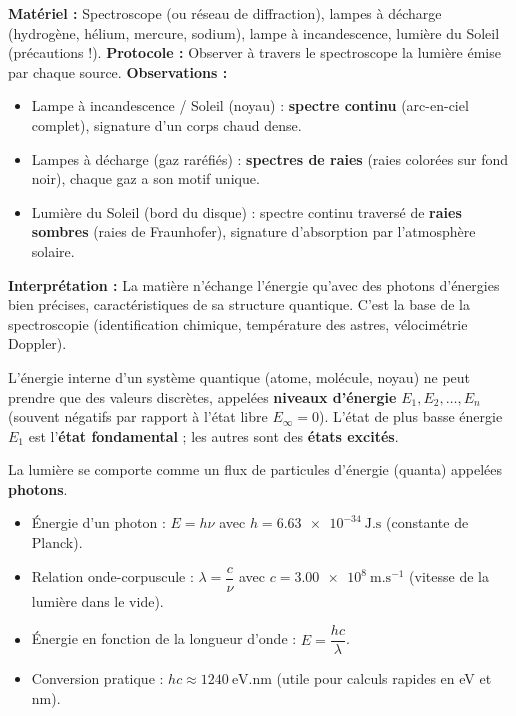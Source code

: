 \documentclass[11pt]{article}
\begin{document}
\begin{experience}
\textbf{Matériel :} Spectroscope (ou réseau de diffraction), lampes à décharge (hydrogène, hélium, mercure, sodium), lampe à incandescence, lumière du Soleil (précautions !).
\textbf{Protocole :} Observer à travers le spectroscope la lumière émise par chaque source.
\textbf{Observations :}
\begin{itemize}
\item Lampe à incandescence / Soleil (noyau) : \textbf{spectre continu} (arc-en-ciel complet), signature d'un corps chaud dense.
\item Lampes à décharge (gaz raréfiés) : \textbf{spectres de raies} (raies colorées sur fond noir), chaque gaz a son motif unique.
\item Lumière du Soleil (bord du disque) : spectre continu traversé de \textbf{raies sombres} (raies de Fraunhofer), signature d'absorption par l'atmosphère solaire.
\end{itemize}
\textbf{Interprétation :} La matière n'échange l'énergie qu'avec des photons d'énergies bien précises, caractéristiques de sa structure quantique. C'est la base de la spectroscopie (identification chimique, température des astres, vélocimétrie Doppler).
\end{experience}

\begin{propriete}
L'énergie interne d'un système quantique (atome, molécule, noyau) ne peut prendre que des valeurs discrètes, appelées \textbf{niveaux d'énergie} $E_1, E_2, \dots, E_n$ (souvent négatifs par rapport à l'état libre $E_\infty = 0$). L'état de plus basse énergie $E_1$ est l'\textbf{état fondamental} ; les autres sont des \textbf{états excités}.
\end{propriete}

\begin{aretenir}
La lumière se comporte comme un flux de particules d'énergie (quanta) appelées \textbf{photons}.
\begin{itemize}
\item Énergie d'un photon : $E = h\nu$ avec $h = \num{6,63e-34}~\text{J.s}$ (constante de Planck).
\item Relation onde-corpuscule : $\lambda = \dfrac{c}{\nu}$ avec $c = \num{3,00e8}~\text{m.s}^{-1}$ (vitesse de la lumière dans le vide).
\item Énergie en fonction de la longueur d'onde : $E = \dfrac{hc}{\lambda}$.
\item Conversion pratique : $hc \approx \num{1240}~\text{eV.nm}$ (utile pour calculs rapides en eV et nm).
\end{itemize}
\end{aretenir}
\end{document}
